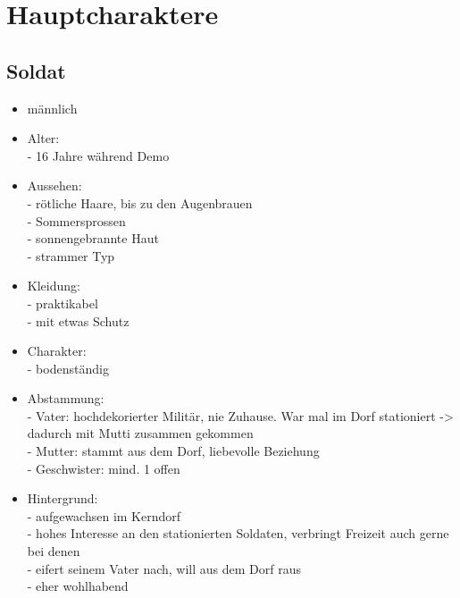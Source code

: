 \chapter{Hauptcharaktere}
\section{Soldat}
\begin{itemize}
	\item männlich
	\item Alter:\\
	- 16 Jahre während Demo
	\item Aussehen:\\
	- rötliche Haare, bis zu den Augenbrauen\\
	- Sommersprossen\\
	- sonnengebrannte Haut\\
	- strammer Typ
	\item Kleidung:\\
	- praktikabel\\
	- mit etwas Schutz
	\item Charakter:\\
	- bodenständig
	\item Abstammung:\\
	- Vater: hochdekorierter Militär, nie Zuhause. War mal im Dorf stationiert -> dadurch mit Mutti zusammen gekommen\\
	- Mutter: stammt aus dem Dorf, liebevolle Beziehung\\
	- Geschwister: mind. 1 offen
	\item Hintergrund:\\
	- aufgewachsen im Kerndorf\\
	- hohes Interesse an den stationierten Soldaten, verbringt Freizeit auch gerne bei denen\\
	- eifert seinem Vater nach, will aus dem Dorf raus\\
	- eher wohlhabend
\end{itemize}

